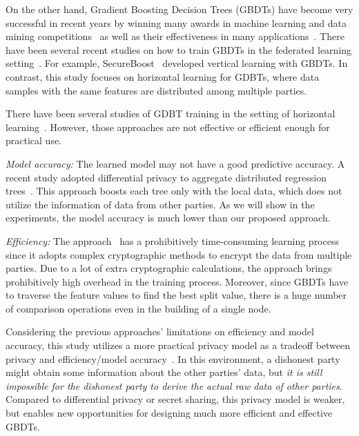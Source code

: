 \documentclass[letterpaper]{article} %
\theoremstyle{definition}
\begin{document}
On the other hand, Gradient Boosting Decision Trees (GBDTs) have become very successful in recent years by winning many awards in machine learning and data mining competitions~\cite{chen2016xgboost} as well as their effectiveness in many applications~\cite{richardson2007predicting,kim2009improving,burges2010ranknet,li2019privacy}. There have been several recent studies on how to train GBDTs in the federated learning setting~\cite{cheng2019secureboost,liu2019boosting,zhao2018inprivate}. For example, SecureBoost~\cite{cheng2019secureboost} developed vertical learning with GBDTs. In contrast, this study focuses on horizontal learning for GDBTs, where data samples with the same features are distributed among multiple parties.


There have been several studies of GDBT training in the setting of horizontal learning~\cite{liu2019boosting,zhao2018inprivate}. However, those approaches are not effective or efficient enough for practical use.

\emph{Model accuracy:}  The learned model may not have a good predictive accuracy. A recent study adopted differential privacy to aggregate distributed regression trees~\cite{zhao2018inprivate}. This approach boosts each tree only with the local data, which does not utilize the information of data from other parties. As we will show in the experiments, the model accuracy is much lower than our proposed approach.


\emph{Efficiency:} The approach~\cite{liu2019boosting} has a prohibitively time-consuming learning process since it adopts complex cryptographic methods to encrypt the data from multiple parties. Due to a lot of extra cryptographic calculations, the approach brings prohibitively high overhead in the training process. Moreover, since GBDTs have to traverse the feature values to find the best split value, there is a huge number of comparison operations even in the building of a single node.



Considering the previous approaches' limitations on efficiency and model accuracy, this study utilizes a more practical privacy model as a tradeoff between privacy and efficiency/model accuracy~\cite{du2004privacy,liu2018secure}. In this environment, a dishonest party might obtain some information about the other parties' data, but \emph{it is still impossible for the dishonest party to derive the actual raw data of other parties}. Compared to differential privacy or secret sharing, this privacy model is weaker, but enables new opportunities for designing much more efficient and effective GBDTs.
\end{document}

